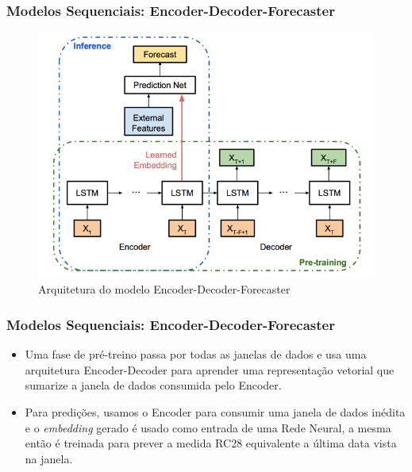\documentclass{beamer}
\begin{document}
\begin{frame}
\frametitle{Modelos Sequenciais: Encoder-Decoder-Forecaster}
\begin{figure}[H]
\centering
\includegraphics[scale=0.4]{uber.png}
\caption{Arquitetura do modelo Encoder-Decoder-Forecaster}
\end{figure}
\end{frame}

\begin{frame}
\frametitle{Modelos Sequenciais: Encoder-Decoder-Forecaster}

\begin{itemize}
  \item Uma fase de pré-treino passa por todas as janelas de dados e usa uma
    arquitetura Encoder-Decoder para aprender uma representação vetorial que
    sumarize a janela de dados consumida pelo Encoder. 
  \item Para predições, usamos o Encoder para consumir uma janela de dados
    inédita e o \textit{embedding} gerado é usado como entrada de uma Rede Neural, a mesma então é
    treinada para prever a medida RC28 equivalente a última data vista na
    janela. 
  
  \end{itemize}

\end{frame}




\begin{frame}
\end{frame}
\end{document}
